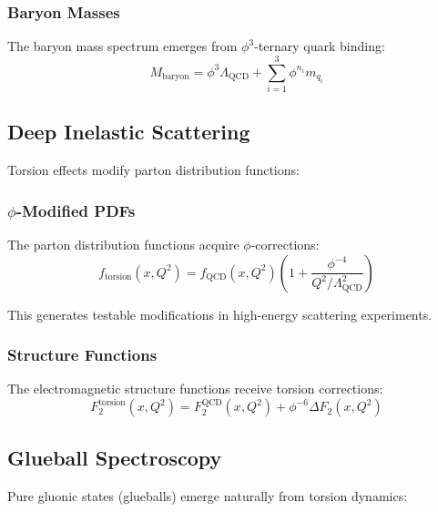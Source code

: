 \subsubsection{Baryon Masses}

The baryon mass spectrum emerges from $\phi^3$-ternary quark binding:
\begin{equation}
M_{\text{baryon}} = \phi^3 \Lambda_{\text{QCD}} + \sum_{i=1}^3 \phi^{n_i} m_{q_i}
\end{equation}

\subsection{Deep Inelastic Scattering}

Torsion effects modify parton distribution functions:

\subsubsection{$\phi$-Modified PDFs}

\begin{theorem}
The parton distribution functions acquire $\phi$-corrections:
\begin{equation}
f_{\text{torsion}}(x, Q^2) = f_{\text{QCD}}(x, Q^2) \left(1 + \frac{\phi^{-4}}{Q^2/\Lambda_{\text{QCD}}^2}\right)
\label{eq:torsion_modified_pdfs}
\end{equation}
\end{theorem}

This generates testable modifications in high-energy scattering experiments.

\subsubsection{Structure Functions}

The electromagnetic structure functions receive torsion corrections:
\begin{equation}
F_2^{\text{torsion}}(x, Q^2) = F_2^{\text{QCD}}(x, Q^2) + \phi^{-6} \Delta F_2(x, Q^2)
\end{equation}

\subsection{Glueball Spectroscopy}

Pure gluonic states (glueballs) emerge naturally from torsion dynamics:

